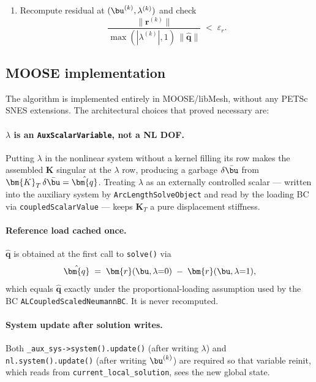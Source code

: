 \begin{enumerate}
\item Recompute residual at $(\bu^{(k)}, \lambda^{(k)})$ and check
\begin{equation}
\frac{\|\bm{r}^{(k)}\|}{\max(|\lambda^{(k)}|, 1)\,\|\hat{\bm{q}}\|} \;<\; \varepsilon_r.
\end{equation}
\end{enumerate}

\subsection{MOOSE implementation}

The algorithm is implemented entirely in MOOSE/libMesh, without any PETSc
SNES extensions. The architectural choices that proved necessary are:

\paragraph{$\lambda$ is an \texttt{AuxScalarVariable}, not a NL DOF.}
Putting $\lambda$ in the nonlinear system without a kernel filling its row
makes the assembled $\bm{K}$ singular at the $\lambda$ row, producing a
garbage $\delta\bar{\bu}$ from $\bm{K}_T\,\delta\bar{\bu}=\hat{\bm{q}}$.
Treating $\lambda$ as an externally controlled scalar — written into the
auxiliary system by \texttt{ArcLengthSolveObject} and read by the loading
BC via \texttt{coupledScalarValue} — keeps $\bm{K}_T$ a pure displacement
stiffness.

\paragraph{Reference load cached once.}
$\hat{\bm{q}}$ is obtained at the first call to \texttt{solve()} via
\begin{equation}
\hat{\bm{q}} \;=\; \bm{r}(\bu, \lambda{=}0) \;-\; \bm{r}(\bu, \lambda{=}1),
\end{equation}
which equals $\hat{\bm{q}}$ exactly under the proportional-loading
assumption used by the BC \texttt{ALCoupledScaledNeumannBC}. It is never
recomputed.

\paragraph{System update after solution writes.}
Both
\texttt{\_aux\_sys->system().update()} (after writing $\lambda$) and
\texttt{nl.system().update()} (after writing $\bu^{(k)}$) are required so
that variable reinit, which reads from \texttt{current\_local\_solution},
sees the new global state.

